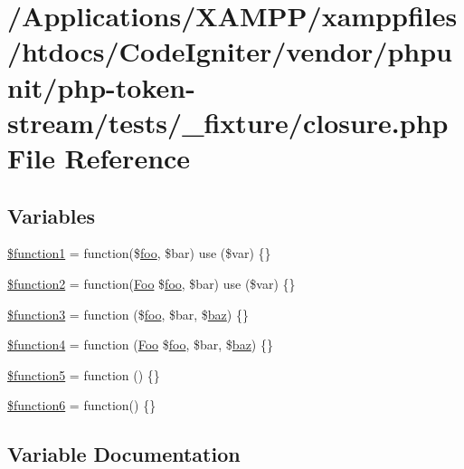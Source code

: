 \hypertarget{closure_8php}{}\section{/\+Applications/\+X\+A\+M\+P\+P/xamppfiles/htdocs/\+Code\+Igniter/vendor/phpunit/php-\/token-\/stream/tests/\+\_\+fixture/closure.php File Reference}
\label{closure_8php}
\subsection*{Variables}
\begin{DoxyCompactItemize}
\item 
\mbox{\hyperlink{closure_8php_a917f59cf14a2cd556bc2a9dbfc59374a}{\$function1}} = function(\$\mbox{\hyperlink{interfacefoo}{foo}}, \$bar) use (\$var) \{\}
\item 
\mbox{\hyperlink{closure_8php_ab837d03d0a806c6167c2388b726b7d99}{\$function2}} = function(\mbox{\hyperlink{class_foo}{Foo}} \$\mbox{\hyperlink{interfacefoo}{foo}}, \$bar) use (\$var) \{\}
\item 
\mbox{\hyperlink{closure_8php_ae5683a59c4ecfa76ab86e853ca344821}{\$function3}} = function (\$\mbox{\hyperlink{interfacefoo}{foo}}, \$bar, \$\mbox{\hyperlink{source__with__oneline__annotations_8php_ae7a58e6eb64e3fa0d88ff421f558d8f4}{baz}}) \{\}
\item 
\mbox{\hyperlink{closure_8php_a5e47042f6b1825000e2a230b7bb6b146}{\$function4}} = function (\mbox{\hyperlink{class_foo}{Foo}} \$\mbox{\hyperlink{interfacefoo}{foo}}, \$bar, \$\mbox{\hyperlink{source__with__oneline__annotations_8php_ae7a58e6eb64e3fa0d88ff421f558d8f4}{baz}}) \{\}
\item 
\mbox{\hyperlink{closure_8php_a019f9473c997ed75e3f78d5e6b93038a}{\$function5}} = function () \{\}
\item 
\mbox{\hyperlink{closure_8php_a6529df55343edecc7be31c09ff54b7cf}{\$function6}} = function() \{\}
\end{DoxyCompactItemize}


\subsection{Variable Documentation}
\mbox{\label{closure_8php_a917f59cf14a2cd556bc2a9dbfc59374a}} 
